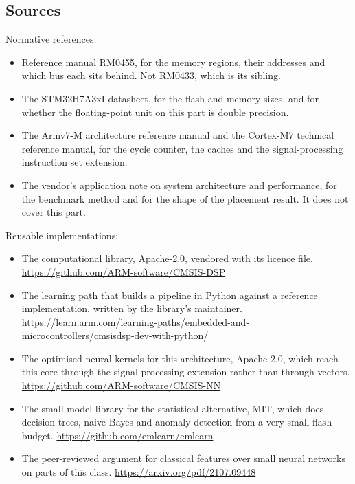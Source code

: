 \subsection*{Sources}

Normative references:
\begin{itemize}
\item Reference manual RM0455, for the memory regions, their addresses and
which bus each sits behind. Not RM0433, which is its sibling.
\item The STM32H7A3xI datasheet, for the flash and memory sizes, and for
whether the floating-point unit on this part is double precision.
\item The Armv7-M architecture reference manual and the Cortex-M7 technical
reference manual, for the cycle counter, the caches and the signal-processing
instruction set extension.
\item The vendor's application note on system architecture and performance, for
the benchmark method and for the shape of the placement result. It does not
cover this part.
\end{itemize}

Reusable implementations:
\begin{itemize}
\item The computational library, Apache-2.0, vendored with its licence
file.\newline
\url{https://github.com/ARM-software/CMSIS-DSP}
\item The learning path that builds a pipeline in Python against a reference
implementation, written by the library's maintainer.\newline
\url{https://learn.arm.com/learning-paths/embedded-and-microcontrollers/cmsisdsp-dev-with-python/}
\item The optimised neural kernels for this architecture, Apache-2.0, which
reach this core through the signal-processing extension rather than through
vectors.\newline
\url{https://github.com/ARM-software/CMSIS-NN}
\item The small-model library for the statistical alternative, MIT, which does
decision trees, naive Bayes and anomaly detection from a very small flash
budget.\newline
\url{https://github.com/emlearn/emlearn}
\item The peer-reviewed argument for classical features over small neural
networks on parts of this class.\newline
\url{https://arxiv.org/pdf/2107.09448}
\end{itemize}
